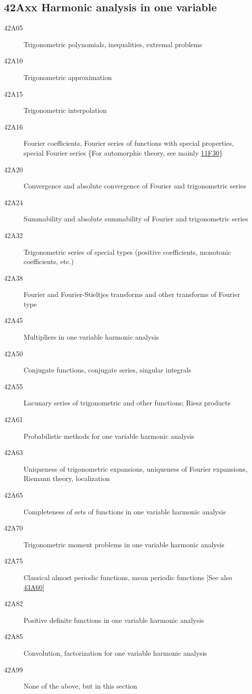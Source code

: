 \documentclass[letterpaper]{article}
\begin{document}
\subsection*{42Axx  Harmonic analysis in one variable }\label{42Axx}
\begin{description}  
\item [42A05]\label{42A05} Trigonometric polynomials, inequalities, extremal problems
\item [42A10]\label{42A10} Trigonometric approximation
\item [42A15]\label{42A15} Trigonometric interpolation
\item [42A16]\label{42A16} Fourier coefficients, Fourier series of functions with special properties, special Fourier series \{For automorphic theory, see mainly \hyperref[11F30]{11F30}\}
\item [42A20]\label{42A20} Convergence and absolute convergence of Fourier and trigonometric series
\item [42A24]\label{42A24} Summability and absolute summability of Fourier and trigonometric series
\item [42A32]\label{42A32} Trigonometric series of special types (positive coefficients, monotonic coefficients, etc.)
\item [42A38]\label{42A38} Fourier and Fourier-Stieltjes transforms and other transforms of Fourier type
\item [42A45]\label{42A45} Multipliers in one variable harmonic analysis
\item [42A50]\label{42A50} Conjugate functions, conjugate series, singular integrals
\item [42A55]\label{42A55} Lacunary series of trigonometric and other functions; Riesz products
\item [42A61]\label{42A61} Probabilistic methods for one variable harmonic analysis
\item [42A63]\label{42A63} Uniqueness of trigonometric expansions, uniqueness of Fourier expansions, Riemann theory, localization
\item [42A65]\label{42A65} Completeness of sets of functions in one variable harmonic analysis
\item [42A70]\label{42A70} Trigonometric moment problems in one variable harmonic analysis
\item [42A75]\label{42A75} Classical almost periodic functions, mean periodic functions [See also \hyperref[43A60]{43A60}]
\item [42A82]\label{42A82} Positive definite functions in one variable harmonic analysis
\item [42A85]\label{42A85} Convolution, factorization for one variable harmonic analysis
\item [42A99]\label{42A99} None of the above, but in this section
\end{description}
\end{document}
